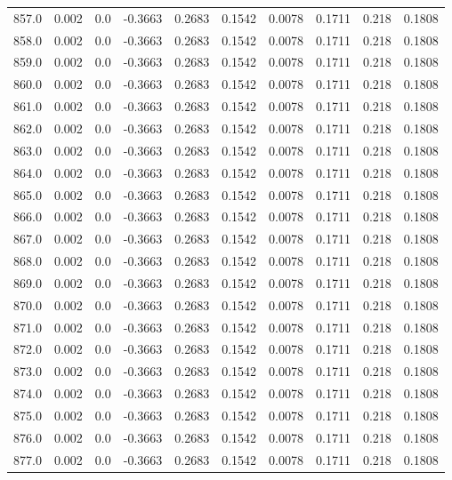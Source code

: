 \begin{longtable}{lrrrrrrrrr}
857.0 & 0.002 & 0.0 & -0.3663 & 0.2683 & 0.1542 & 0.0078 & 0.1711 & 0.218 & 0.1808 \\
858.0 & 0.002 & 0.0 & -0.3663 & 0.2683 & 0.1542 & 0.0078 & 0.1711 & 0.218 & 0.1808 \\
859.0 & 0.002 & 0.0 & -0.3663 & 0.2683 & 0.1542 & 0.0078 & 0.1711 & 0.218 & 0.1808 \\
860.0 & 0.002 & 0.0 & -0.3663 & 0.2683 & 0.1542 & 0.0078 & 0.1711 & 0.218 & 0.1808 \\
861.0 & 0.002 & 0.0 & -0.3663 & 0.2683 & 0.1542 & 0.0078 & 0.1711 & 0.218 & 0.1808 \\
862.0 & 0.002 & 0.0 & -0.3663 & 0.2683 & 0.1542 & 0.0078 & 0.1711 & 0.218 & 0.1808 \\
863.0 & 0.002 & 0.0 & -0.3663 & 0.2683 & 0.1542 & 0.0078 & 0.1711 & 0.218 & 0.1808 \\
864.0 & 0.002 & 0.0 & -0.3663 & 0.2683 & 0.1542 & 0.0078 & 0.1711 & 0.218 & 0.1808 \\
865.0 & 0.002 & 0.0 & -0.3663 & 0.2683 & 0.1542 & 0.0078 & 0.1711 & 0.218 & 0.1808 \\
866.0 & 0.002 & 0.0 & -0.3663 & 0.2683 & 0.1542 & 0.0078 & 0.1711 & 0.218 & 0.1808 \\
867.0 & 0.002 & 0.0 & -0.3663 & 0.2683 & 0.1542 & 0.0078 & 0.1711 & 0.218 & 0.1808 \\
868.0 & 0.002 & 0.0 & -0.3663 & 0.2683 & 0.1542 & 0.0078 & 0.1711 & 0.218 & 0.1808 \\
869.0 & 0.002 & 0.0 & -0.3663 & 0.2683 & 0.1542 & 0.0078 & 0.1711 & 0.218 & 0.1808 \\
870.0 & 0.002 & 0.0 & -0.3663 & 0.2683 & 0.1542 & 0.0078 & 0.1711 & 0.218 & 0.1808 \\
871.0 & 0.002 & 0.0 & -0.3663 & 0.2683 & 0.1542 & 0.0078 & 0.1711 & 0.218 & 0.1808 \\
872.0 & 0.002 & 0.0 & -0.3663 & 0.2683 & 0.1542 & 0.0078 & 0.1711 & 0.218 & 0.1808 \\
873.0 & 0.002 & 0.0 & -0.3663 & 0.2683 & 0.1542 & 0.0078 & 0.1711 & 0.218 & 0.1808 \\
874.0 & 0.002 & 0.0 & -0.3663 & 0.2683 & 0.1542 & 0.0078 & 0.1711 & 0.218 & 0.1808 \\
875.0 & 0.002 & 0.0 & -0.3663 & 0.2683 & 0.1542 & 0.0078 & 0.1711 & 0.218 & 0.1808 \\
876.0 & 0.002 & 0.0 & -0.3663 & 0.2683 & 0.1542 & 0.0078 & 0.1711 & 0.218 & 0.1808 \\
877.0 & 0.002 & 0.0 & -0.3663 & 0.2683 & 0.1542 & 0.0078 & 0.1711 & 0.218 & 0.1808 \\

\end{longtable}
